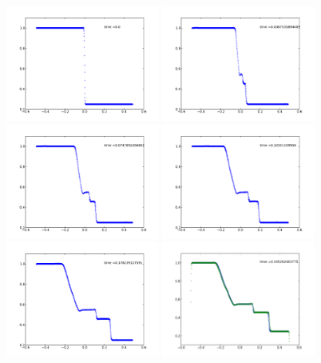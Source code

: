 \documentclass[11pt,letterpaper]{article}
\begin{document}
\begin{figure}[h!]
	\centering
	\includegraphics[width=0.45\textwidth]{Shock1}
	\includegraphics[width=0.45\textwidth]{Shock2} \\
	\includegraphics[width=0.45\textwidth]{Shock3}
	\includegraphics[width=0.45\textwidth]{Shock4} \\
	\includegraphics[width=0.45\textwidth]{Shock5}
	\includegraphics[width=0.45\textwidth]{Shockfinal}
\end{figure}	
\end{document}
